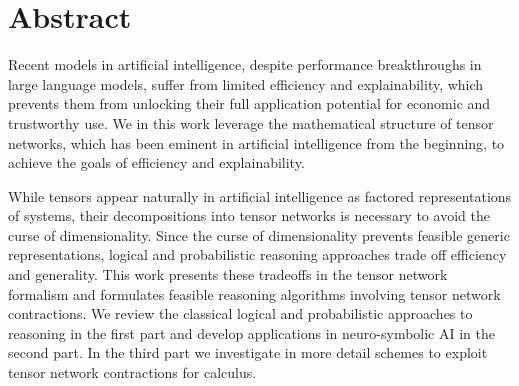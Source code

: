 \chapter{Abstract}

Recent models in artificial intelligence, despite performance breakthroughs in large language models, suffer from limited efficiency and explainability, which prevents them from unlocking their full application potential for economic and trustworthy use.
We in this work leverage the mathematical structure of tensor networks, which has been eminent in artificial intelligence from the beginning, to achieve the goals of efficiency and explainability.

While tensors appear naturally in artificial intelligence as factored representations of systems, their decompositions into tensor networks is necessary to avoid the curse of dimensionality. %
Since the curse of dimensionality prevents feasible generic representations, logical and probabilistic reasoning approaches trade off efficiency and generality.
This work presents these tradeoffs in the tensor network formalism and formulates feasible reasoning algorithms involving tensor network contractions.
We review the classical logical and probabilistic approaches to reasoning in the first part and develop applications in neuro-symbolic AI in the second part.
In the third part we investigate in more detail schemes to exploit tensor network contractions for calculus.